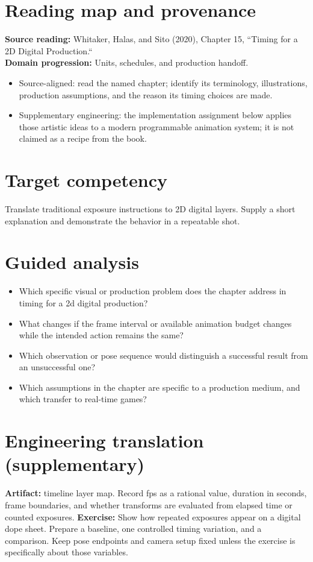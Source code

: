 \documentclass[10pt,letterpaper]{article}
\begin{document}
\makedoctitle
\makedocsummary

\section{Reading map and provenance}
\textbf{Source reading:} Whitaker, Halas, and Sito (2020), Chapter 15, ``Timing for a 2D Digital Production.``\\
\textbf{Domain progression:} Units, schedules, and production handoff.
\begin{itemize}
\item Source-aligned: read the named chapter; identify its terminology, illustrations, production assumptions, and the reason its timing choices are made.
\item Supplementary engineering: the implementation assignment below applies those artistic ideas to a modern programmable animation system; it is not claimed as a recipe from the book.
\end{itemize}
\section{Target competency}
Translate traditional exposure instructions to 2D digital layers. Supply a short explanation and demonstrate the behavior in a repeatable shot.
\section{Guided analysis}
\begin{itemize}
\item Which specific visual or production problem does the chapter address in timing for a 2d digital production?
\item What changes if the frame interval or available animation budget changes while the intended action remains the same?
\item Which observation or pose sequence would distinguish a successful result from an unsuccessful one?
\item Which assumptions in the chapter are specific to a production medium, and which transfer to real-time games?
\end{itemize}
\section{Engineering translation (supplementary)}
\textbf{Artifact:} timeline layer map. Record fps as a rational value, duration in seconds, frame boundaries, and whether transforms are evaluated from elapsed time or counted exposures.
\textbf{Exercise:} Show how repeated exposures appear on a digital dope sheet. Prepare a baseline, one controlled timing variation, and a comparison. Keep pose endpoints and camera setup fixed unless the exercise is specifically about those variables.
\end{document}

